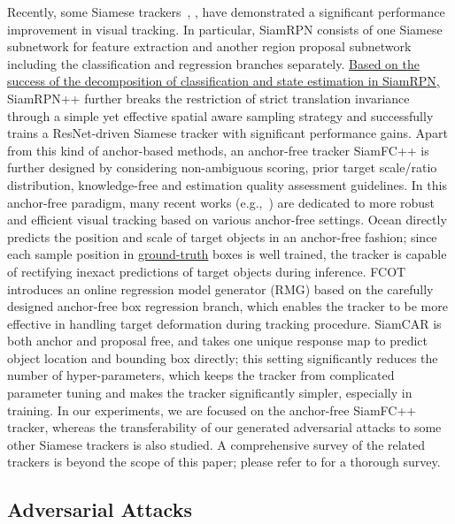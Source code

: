 \documentclass[journal]{IEEEtran}
\newcommand{\eg}{e.g.}
\begin{document}
Recently, some Siamese trackers~\cite{SiamFC++}, \cite{zhang2020ocean, cui2020fully, 9157720}, \cite{SiamRPN,SiamRPN++} have demonstrated a significant performance improvement in visual tracking. In particular, SiamRPN \cite{SiamRPN} consists of one Siamese subnetwork for feature extraction and another region proposal subnetwork including the classification and regression branches separately. \uline{Based on the success of the decomposition of classification and state estimation in SiamRPN,} SiamRPN++ \cite{SiamRPN++} further breaks the restriction of strict translation invariance through a simple yet effective spatial aware sampling strategy and successfully trains a ResNet-driven Siamese tracker with significant performance gains. Apart from this kind of anchor-based methods, an anchor-free tracker SiamFC++ \cite{SiamFC++} is further designed by considering non-ambiguous scoring, prior target scale/ratio distribution, knowledge-free and estimation quality assessment guidelines. In this anchor-free paradigm, many recent works (\eg,~\cite{zhang2020ocean, cui2020fully, 9157720}) are dedicated to more robust and efficient visual tracking based on various anchor-free settings. Ocean \cite{zhang2020ocean} directly predicts the position and scale of target objects in an anchor-free fashion; since each sample position in \uline{ground-truth} boxes is well trained, the tracker is capable of rectifying inexact predictions of target objects during inference. FCOT \cite{cui2020fully} introduces an online regression model generator (RMG) based on the carefully designed anchor-free box regression branch, which enables the tracker to be more effective in handling target deformation during tracking procedure. SiamCAR \cite{9157720} is both anchor and proposal free, and takes one unique response map to predict object location and bounding box directly; this setting significantly reduces the number of hyper-parameters, which keeps the tracker from complicated parameter tuning and makes the tracker significantly simpler, especially in training. In our experiments, we are focused on the anchor-free SiamFC++ tracker, whereas the transferability of our generated adversarial attacks to some other Siamese trackers is also studied. A comprehensive survey of the related trackers is beyond the scope of this paper\uline{;} please refer to \cite{9339950} for a thorough survey.
\vspace{-2mm}

\subsection{Adversarial Attacks}
\end{document}
